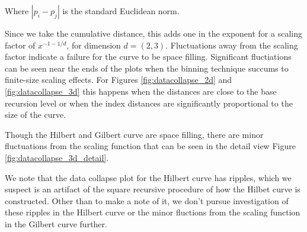 Where $|p_i - p_j|$ is the standard Euclidean norm.

Since we take the cumulative distance, this adds one in the exponent for a scaling factor of $x^{-1-1/d}$,
for dimension $d = (2,3)$.
Fluctuations away from the scaling factor indicate a failure for the curve to be space filling.
Significant fluctiations can be seen near the ends of the plots when the binning technique
succums to finite-size scaling effects.
For Figures \ref{fig:datacollapse_2d} and \ref{fig:datacollapse_3d} this happens when the distances
are close to the base recursion level or when the index distances are significantly proportional to
the size of the curve.

Though the Hilbert and Gilbert curve are space filling, there are minor fluctuations from the scaling
function that can be seen in the detail view Figure \ref{fig:datacollapse_3d_detail}.

We note that the data collapse plot for the Hilbert curve has ripples, which
we suspect is an artifact of the square recursive procedure of how
the Hilbet curve is constructed.
Other than to make a note of it, we don't pursue investigation of these ripples in the Hilbert curve
or the minor fluctions from the scaling function in the Gilbert curve further.


